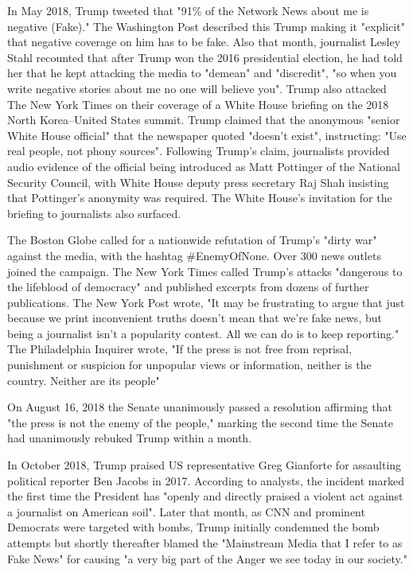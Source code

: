 In May 2018, Trump tweeted that "91\% of the Network News about me is
negative (Fake)." The Washington Post described this Trump making it
"explicit" that negative coverage on him has to be fake. Also that
month, journalist Lesley Stahl recounted that after Trump won the 2016
presidential election, he had told her that he kept attacking the media
to "demean" and "discredit", "so when you write negative stories about
me no one will believe you". Trump also attacked The New York Times on
their coverage of a White House briefing on the 2018 North Korea--United
States summit. Trump claimed that the anonymous "senior White House
official" that the newspaper quoted "doesn't exist", instructing: "Use
real people, not phony sources". Following Trump's claim, journalists
provided audio evidence of the official being introduced as Matt
Pottinger of the National Security Council, with White House deputy
press secretary Raj Shah insisting that Pottinger's anonymity was
required. The White House's invitation for the briefing to journalists
also surfaced.

The Boston Globe called for a nationwide refutation of Trump's "dirty
war" against the media, with the hashtag \#EnemyOfNone. Over 300 news
outlets joined the campaign. The New York Times called Trump's attacks
"dangerous to the lifeblood of democracy" and published excerpts from
dozens of further publications. The New York Post wrote, "It may be
frustrating to argue that just because we print inconvenient truths
doesn't mean that we're fake news, but being a journalist isn't a
popularity contest. All we can do is to keep reporting." The
Philadelphia Inquirer wrote, "If the press is not free from reprisal,
punishment or suspicion for unpopular views or information, neither is
the country. Neither are its people"

On August 16, 2018 the Senate unanimously passed a resolution affirming
that "the press is not the enemy of the people," marking the second time
the Senate had unanimously rebuked Trump within a month.

In October 2018, Trump praised US representative Greg Gianforte for
assaulting political reporter Ben Jacobs in 2017. According to analysts,
the incident marked the first time the President has "openly and
directly praised a violent act against a journalist on American soil".
Later that month, as CNN and prominent Democrats were targeted with
bombs, Trump initially condemned the bomb attempts but shortly
thereafter blamed the "Mainstream Media that I refer to as Fake News"
for causing "a very big part of the Anger we see today in our society."

